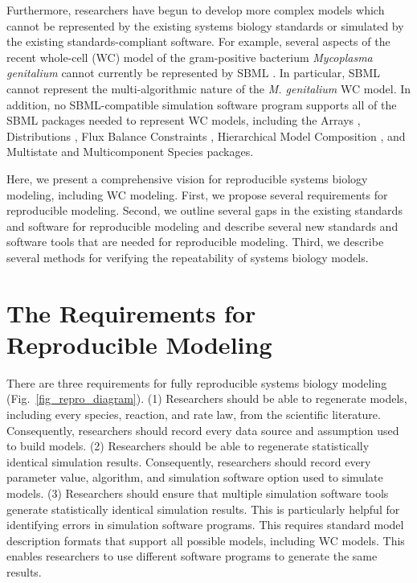 \documentclass[journal,transmag,twoside]{IEEEtran}
\begin{document}
Furthermore, researchers have begun to develop more complex models which cannot be represented by the existing systems biology standards or simulated by the existing standards-compliant software. For example, several aspects of the recent whole-cell (WC) model of the gram-positive bacterium \textit{Mycoplasma genitalium} \cite{Karr2012} cannot currently be represented by SBML \cite{Waltemath2016}. In particular, SBML cannot represent the multi-algorithmic nature of the \textit{M. genitalium} WC model. In addition, no SBML-compatible simulation software program supports all of the SBML packages needed to represent WC models, including the Arrays \cite{watanabe2016efficient}, Distributions \cite{Moodie2015}, Flux Balance Constraints \cite{olivier2015fbc}, Hierarchical Model Composition \cite{smith2015sbml}, and Multistate and Multicomponent Species \cite{SBMLMulti} packages.

Here, we present a comprehensive vision for reproducible systems biology modeling, including WC modeling. First, we propose several requirements for reproducible modeling. Second, we outline several gaps in the existing standards and software for reproducible modeling and describe several new standards and software tools that are needed for reproducible modeling. Third, we describe several methods for verifying the repeatability of systems biology models.

\section{The Requirements for Reproducible Modeling}

There are three requirements for fully reproducible systems biology modeling (Fig.~\ref{fig_repro_diagram}). (1) Researchers should be able to regenerate models, including every species, reaction, and rate law, from the scientific literature. Consequently, researchers should record every data source and assumption used to build models. (2) Researchers should be able to regenerate statistically identical simulation results. Consequently, researchers should record every parameter value, algorithm, and simulation software option used to simulate models. (3) Researchers should ensure that multiple simulation software tools generate statistically identical simulation results. This is particularly helpful for identifying errors in simulation software programs. This requires standard model description formats that support all possible models, including WC models. This enables researchers to use different software programs to generate the same results.
\end{document}
